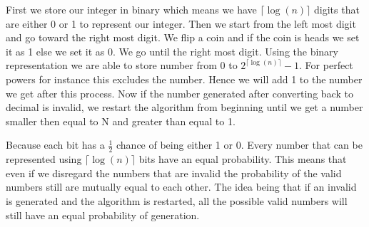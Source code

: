 \documentclass[12pt]{article}
\begin{document}
\begin{answer}
    First we store our integer in binary which means we have $\lceil\log(n) \rceil$ digits that are either 0 or 1 to represent our integer. Then we start from the left most digit and go toward the right most digit. We flip a coin and if the coin is heads we set it as 1 else we set it as 0. We go until the right most digit. Using the binary representation we are able to store number from 0 to $2^{\lceil\log(n)\rceil} - 1$. For perfect powers for instance this excludes the number. Hence we will add 1 to the number we get after this process. Now if the number generated after converting back to decimal is invalid, we restart the algorithm from beginning until we get a number smaller then equal to N and greater than equal to 1. 


    Because each bit has a $\frac{1}{2}$ chance of being either 1 or 0. Every number that can be represented using  $\lceil \log(n) \rceil$ bits have an equal probability. This means that even if we disregard the numbers that are invalid the probability of the valid numbers still are mutually equal to each other. The idea being that if an invalid is generated and the algorithm is restarted, all the possible valid numbers will still have an equal probability of generation. 


    




\end{answer}

\newpage 
\end{document}
